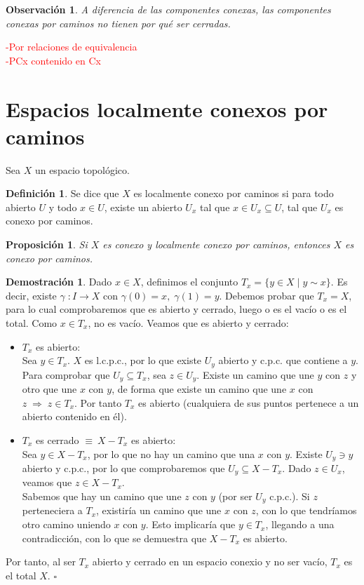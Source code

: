 \documentclass[12pt,twoside]{report}
\theoremstyle{azul}
\theoremstyle{azul2}
\newtheorem*{obsx}{Observación}
\theoremstyle{plain}
\newtheorem*{prop}{Proposición}
\theoremstyle{definition}
\newtheorem*{defi}{Definición}
\newtheorem*{dem}{Demostración}
\theoremstyle{remark}
\begin{document}
\begin{obsx}
A diferencia de las componentes conexas, las componentes conexas por caminos no tienen por qué ser cerradas.
\end{obsx}

\textcolor{red}{-Por relaciones de equivalencia\\
-PCx contenido en Cx} %

\section{Espacios localmente conexos por caminos}
Sea $X$ un espacio topológico.
\begin{defi}
Se dice que $X$ es localmente conexo por caminos si para todo abierto $U$ y todo $x \in U$, existe un abierto $U_x$ tal que $x \in U_x \subseteq U$, tal que $U_x$ es conexo por caminos.
\end{defi}
\begin{prop}
Si $X$ es conexo y localmente conexo por caminos, entonces $X$ es conexo por caminos. 
\end{prop}
\begin{dem} \justifying
Dado $x \in X$, definimos el conjunto $T_x = \{ y \in X \; | \; y \sim x\}$. Es decir, existe $\gamma \; : I \rightarrow X$ con $\gamma(0)=x, \; \gamma(1)=y$. Debemos probar que $T_x=X$, para lo cual comprobaremos que es abierto y cerrado, luego o es el vacío o es el total. Como $x \in T_x$, no es vacío. Veamos que es abierto y cerrado: \vspace{-5mm}
\begin{itemize}
    \item $T_x$ es abierto:\\
    Sea $y \in T_x$. $X$ es l.c.p.c., por lo que existe $U_y$ abierto y c.p.c. que contiene a $y$. Para comprobar que $U_y \subseteq T_x$, sea $z \in U_y$. Existe un camino que une $y$ con $z$ y otro que une $x$ con $y$, de forma que existe un camino que une $x$ con $z \; \Rightarrow \; z \in T_x$. Por tanto $T_x$ es abierto (cualquiera de sus puntos pertenece a un abierto contenido en él).
    \item $T_x$ es cerrado $\equiv \: X-T_x$ es abierto:\\
    Sea $y \in X - T_x$, por lo que no hay un camino que una $x$ con $y$. Existe $U_y \ni y$ abierto y c.p.c., por lo que comprobaremos que $U_y \subseteq X-T_x$. Dado $z \in U_x$, veamos que $z \in X- T_x$.\\
    Sabemos que hay un camino que une $z$ con $y$ (por ser $U_y$ c.p.c.). Si $z$ perteneciera a $T_x$, existiría un camino que une $x$ con $z$, con lo que tendríamos otro camino uniendo $x$ con $y$. Esto implicaría que $y \in T_x$, llegando a una contradicción, con lo que se demuestra que $X-T_x$ es abierto.
\end{itemize}
Por tanto, al ser $T_x$ abierto y cerrado en un espacio conexio y no ser vacío, $T_x$ es el total $X$. \hfill $\square$
\end{dem}
\end{document}

